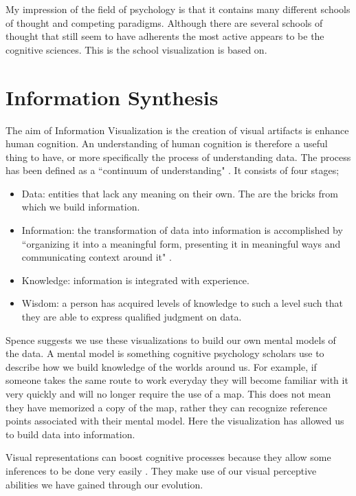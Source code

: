 \documentclass[a4paper, 10pt, titlepage, twocolumn, onehalfspace]{article}
\begin{document}
My impression of the field of psychology is that it contains many different schools of thought and competing paradigms. Although there are several schools of thought that still seem to have adherents the most active appears to be the cognitive sciences. This is the school visualization is based on.

\section{Information Synthesis}
The aim of Information Visualization is the creation of visual artifacts is enhance human cognition. An understanding of human cognition is therefore a useful thing to have, or more specifically the process of understanding data. The process has been defined as a ``continuum of understanding" \cite{jacobson1999information}. It consists of four stages;
\begin{itemize}
\item Data: entities that lack any meaning on their own. The are the bricks from which we build information.
\item Information: the transformation of data into information is accomplished by ``organizing it into a meaningful form, presenting it in meaningful ways and communicating context around it" \cite{jacobson1999information}.
\item Knowledge: information is integrated with experience.
\item Wisdom: a person has acquired levels of knowledge to such a level such that they are able to express qualified judgment on data.
\end{itemize}

Spence \cite{spence2001information} suggests we use these visualizations to build our own mental models of the data. A mental model is something cognitive psychology scholars use to describe how we build knowledge of the worlds around us. For example, if someone takes the same route to work everyday they will become familiar with it very quickly and will no longer require the use of a map. This does not mean they have memorized a copy of the map, rather they can recognize reference points associated with their mental model. Here the visualization has allowed us to build data into information.

Visual representations can boost cognitive processes because they allow some inferences to be done very easily \cite{card1999readings}. They make use of our visual perceptive abilities we have gained through our evolution.
\end{document}
